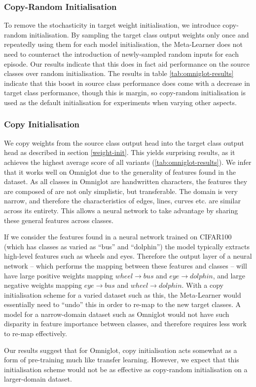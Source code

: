 \documentclass{report}
\begin{document}
\subsubsection{Copy-Random Initialisation}
To remove the stochasticity in target weight initialisation, we introduce copy-random initialisation. By sampling the target class output weights only once and repeatedly using them for each model initialisation, the Meta-Learner does not need to counteract the introduction of newly-sampled random inputs for each episode. Our results indicate that this does in fact aid performance on the source classes over random initialisation. The results in table \ref{tab:omniglot-results} indicate that this boost in source class performance does come with a decrease in target class performance, though this is margin, so copy-random initialisation is used as the default initialisation for experiments when varying other aspects.

\subsubsection{Copy Initialisation}
We copy weights from the source class output head into the target class output head as described in section \ref{weight-init}. This yields surprising results, as it achieves the highest average score of all variants (\ref{tab:omniglot-results}). We infer that it works well on Omniglot due to the generality of features found in the dataset. As all classes in Omniglot are handwritten characters, the features they are composed of are not only simplistic, but transferable. The domain is very narrow, and therefore the characteristics of edges, lines, curves etc. are similar across its entirety. This allows a neural network to take advantage by sharing these general features across classes. \par
If we consider the features found in a neural network trained on CIFAR100 (which has classes as varied as ``bus'' and ``dolphin'') the model typically extracts high-level features such as wheels and eyes\parencite{deepvis}. Therefore the output layer of a neural network -- which performs the mapping between these features and classes -- will have large positive weights mapping $wheel\rightarrow bus$ and $eye\rightarrow dolphin$, and large negative weights mapping $eye\rightarrow bus$ and $wheel\rightarrow dolphin$. With a copy initialisation scheme for a varied dataset such as this, the Meta-Learner would essentially need to ``undo'' this in order to re-map to the new target classes. A model for a narrow-domain dataset such as Omniglot would not have such disparity in feature importance between classes, and therefore requires less work to re-map effectively. \par
Our results suggest that for Omniglot, copy initialisation acts somewhat as a form of pre-training much like transfer learning. However, we expect that this initialisation scheme would not be as effective as copy-random initialisation on a larger-domain dataset.
\end{document}
